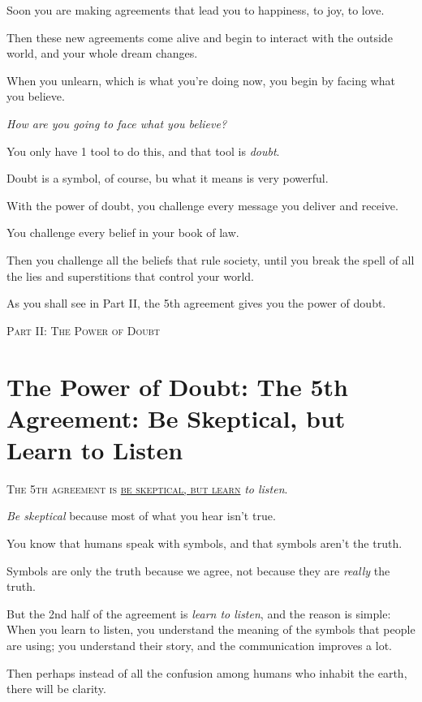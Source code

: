 \documentclass{article}
\numberwithin{equation}{section}
\begin{document}
Soon you are making agreements that lead you to happiness, to joy, to love.

Then these new agreements come alive and begin to interact with the outside world, and your whole dream changes.

%
When you unlearn, which is what you're doing now, you begin by facing what you believe.

\textit{How are you going to face what you believe?}

You only have 1 tool to do this, and that tool is \textit{doubt}.

Doubt is a symbol, of course, bu what it means is very powerful.

With the power of doubt, you challenge every message you deliver and receive.

You challenge every belief in your book of law.

Then you challenge all the beliefs that rule society, until you break the spell of all the lies and superstitions that control your world.

As you shall see in Part II, the 5th agreement gives you the power of doubt.


\begin{center}
    \huge\textsc{Part II: The Power of Doubt}
\end{center}

\section{The Power of Doubt: The 5th Agreement: Be Skeptical, but Learn to Listen}
\textsc{The 5th agreement is \underline{be skeptical, but learn}} \textit{to listen}.

\textit{Be skeptical} because most of what you hear isn't true.

You know that humans speak with symbols, and that symbols aren't the truth.

Symbols are only the truth because we agree, not because they are \textit{really} the truth.

But the 2nd half of the agreement is \textit{learn to listen}, and the reason is simple: When you learn to listen, you understand the meaning of the symbols that people are using; you understand their story, and the communication improves a lot.

Then perhaps instead of all the confusion among humans who inhabit the earth, there will be clarity.
\end{document}
